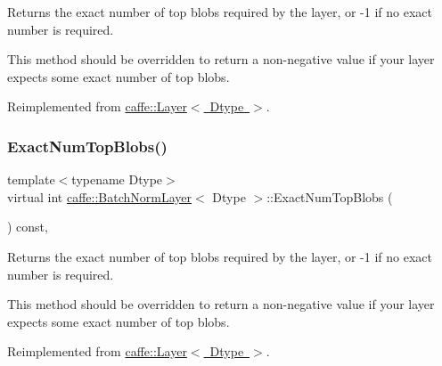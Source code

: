 Returns the exact number of top blobs required by the layer, or -\/1 if no exact number is required. 

This method should be overridden to return a non-\/negative value if your layer expects some exact number of top blobs. 

Reimplemented from \mbox{\hyperlink{classcaffe_1_1_layer_a64e2ca72c719e4b2f1f9216ccfb0d37f}{caffe\+::\+Layer$<$ Dtype $>$}}.

\mbox{\label{classcaffe_1_1_batch_norm_layer_ab8575decdd0c5c42e24b9c3424f708ad}} 
\subsubsection{\texorpdfstring{Exact\+Num\+Top\+Blobs()}{ExactNumTopBlobs()}\hspace{0.1cm}{\footnotesize\ttfamily [2/2]}}
{\footnotesize\ttfamily template$<$typename Dtype$>$ \\
virtual int \mbox{\hyperlink{classcaffe_1_1_batch_norm_layer}{caffe\+::\+Batch\+Norm\+Layer}}$<$ Dtype $>$\+::Exact\+Num\+Top\+Blobs (\begin{DoxyParamCaption}{ }\end{DoxyParamCaption}) const\hspace{0.3cm}{\ttfamily [inline]}, {\ttfamily [virtual]}}



Returns the exact number of top blobs required by the layer, or -\/1 if no exact number is required. 

This method should be overridden to return a non-\/negative value if your layer expects some exact number of top blobs. 

Reimplemented from \mbox{\hyperlink{classcaffe_1_1_layer_a64e2ca72c719e4b2f1f9216ccfb0d37f}{caffe\+::\+Layer$<$ Dtype $>$}}.

\mbox{\label{classcaffe_1_1_batch_norm_layer_a259d8b26c05450339b33ad024f356b6a}} 
